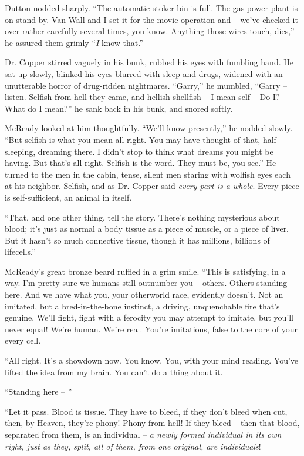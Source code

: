 \documentclass[letterpaper,openany,12pt]{memoir}		%
\begin{document}
Dutton nodded sharply. ``The automatic stoker bin is full. The gas power plant
is on stand-by. Van Wall and I set it for the movie operation and -- we've
checked it over rather carefully several times, you know. Anything those wires
touch, dies,'' he assured them grimly ``\emph{I} know that.''

Dr. Copper stirred vaguely in his bunk, rubbed his eyes with fumbling hand. He
sat up slowly, blinked his eyes blurred with sleep and drugs, widened with an
unutterable horror of drug-ridden nightmares. ``Garry,'' he mumbled, ``Garry --
listen. Selfish-from hell they came, and hellish shellfish -- I mean self -- Do
I? What do I mean?'' he sank back in his bunk, and snored softly.

McReady looked at him thoughtfully. ``We'll know presently,'' he nodded slowly.
``But selfish is what you mean all right. You may have thought of that,
half-sleeping, dreaming there. I didn't stop to think what dreams you might be
having. But that's all right. Selfish is the word. They must be, you see.'' He
turned to the men in the cabin, tense, silent men staring with wolfish eyes each
at his neighbor. Selfish, and as Dr. Copper said \emph{every part is a whole}.
Every piece is self-sufficient, an animal in itself.

``That, and one other thing, tell the story. There's nothing mysterious about
blood; it's just as normal a body tissue as a piece of muscle, or a piece of
liver. But it hasn't so much connective tissue, though it has millions, billions
of lifecells.''

McReady's great bronze beard ruffled in a grim smile. ``This is satisfying, in a
way. I'm pretty-sure we humans still outnumber you -- others. Others standing
here. And we have what you, your otherworld race, evidently doesn't. Not an
imitated, but a bred-in-the-bone instinct, a driving, unquenchable fire that's
genuine. We'll fight, fight with a ferocity you may attempt to imitate, but
you'll never equal! We're human. We're real. You're imitations, false to the
core of your every cell.

``All right. It's a showdown now. You know. You, with your mind reading. You've
lifted the idea from my brain. You can't do a thing about it.

``Standing here -- ''

``Let it pass. Blood is tissue. They have to bleed, if they don't bleed when
cut, then, by Heaven, they're phony! Phony from hell! If they bleed -- then that
blood, separated from them, is an individual -- \emph{a newly formed individual
in its own right, just as they, split, all of them, from one original, are
individuals}!
\end{document}
